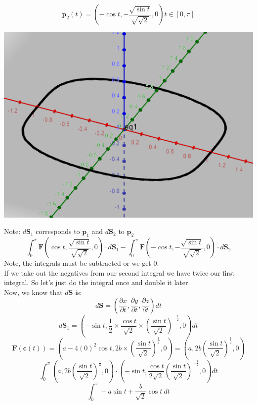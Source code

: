 \documentclass[12pt]{article}
\begin{document}
$$
\mathbf{p}_2(t)=\left(-\cos t, -\frac{\sqrt{\sin t}}{\sqrt{\sqrt{2}}}, 0\right) t \in [0, \pi]
$$
\begin{center}
  \includegraphics{capture1}
\end{center}
Note: $d \mathbf{S}_1$ corresponds to $\mathbf{p}_1$ and  $d \mathbf{S}_2$ to $\mathbf{p}_2$
$$
\int^{\pi}_{0}\mathbf{F}\left(\cos t, \frac{\sqrt{\sin t}}{\sqrt{\sqrt{2}}}, 0\right)
\cdot
d \mathbf{S}_1
-\int^{\pi}_{0}\mathbf{F}\left(-\cos t, -\frac{\sqrt{\sin t}}{\sqrt{\sqrt{2}}}, 0\right)
\cdot
d \mathbf{S}_2
$$
Note, the integrals must be subtracted or we get $0$. \\
\medskip
If we take out the negatives from our second integral we have twice our first 
integral. So let's just do the integral once and double it later.\\
Now, we know that $d \mathbf{S}$ is:
$$
d\mathbf{S}= \left( \frac{\partial x}{\partial t}, \frac{\partial y}{\partial t}, \frac{\partial z}{\partial t}\right) dt
$$
$$
d\mathbf{S}_1=
\left( 
  -\sin t, 
  \frac{1}{2}\times\frac{\cos t}{\sqrt{2}}\times\left( \frac{\sin t}{\sqrt{2}}\right)^{-\frac{1}{2}}, 
  0
\right)dt
$$
$$
\mathbf{F}(\mathbf{c}(t))=
\left( 
  a-4(0)^2\cos t,
  2b \times \left( \frac{\sin t}{\sqrt{2}} \right)^{\frac{1}{2}},
  0
\right)
=
\left( 
  a,
  2b \left( \frac{\sin t}{\sqrt{2}} \right)^{\frac{1}{2}},
  0
\right)
$$
$$
\int^{\pi}_{0}
\left( 
  a,
  2b \left( \frac{\sin t}{\sqrt{2}} \right)^{\frac{1}{2}},
  0
\right)
\cdot
\left( 
  -\sin t, 
  \frac{\cos t}{2\sqrt{2}}\left( \frac{\sin t}{\sqrt{2}}\right)^{-\frac{1}{2}}, 
  0
\right)dt
$$
$$
\int^{\pi}_{0}
-a\sin t + \frac{b}{\sqrt{2}}\cos t \
dt
$$
\end{document}
